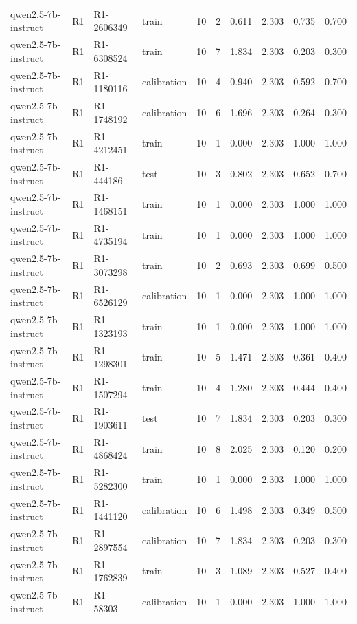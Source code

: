\begin{table}
\begin{tabular}{llllrrrrrr}
qwen2.5-7b-instruct & R1 & R1-2606349 & train & 10 & 2 & 0.611 & 2.303 & 0.735 & 0.700 \\
qwen2.5-7b-instruct & R1 & R1-6308524 & train & 10 & 7 & 1.834 & 2.303 & 0.203 & 0.300 \\
qwen2.5-7b-instruct & R1 & R1-1180116 & calibration & 10 & 4 & 0.940 & 2.303 & 0.592 & 0.700 \\
qwen2.5-7b-instruct & R1 & R1-1748192 & calibration & 10 & 6 & 1.696 & 2.303 & 0.264 & 0.300 \\
qwen2.5-7b-instruct & R1 & R1-4212451 & train & 10 & 1 & 0.000 & 2.303 & 1.000 & 1.000 \\
qwen2.5-7b-instruct & R1 & R1-444186 & test & 10 & 3 & 0.802 & 2.303 & 0.652 & 0.700 \\
qwen2.5-7b-instruct & R1 & R1-1468151 & train & 10 & 1 & 0.000 & 2.303 & 1.000 & 1.000 \\
qwen2.5-7b-instruct & R1 & R1-4735194 & train & 10 & 1 & 0.000 & 2.303 & 1.000 & 1.000 \\
qwen2.5-7b-instruct & R1 & R1-3073298 & train & 10 & 2 & 0.693 & 2.303 & 0.699 & 0.500 \\
qwen2.5-7b-instruct & R1 & R1-6526129 & calibration & 10 & 1 & 0.000 & 2.303 & 1.000 & 1.000 \\
qwen2.5-7b-instruct & R1 & R1-1323193 & train & 10 & 1 & 0.000 & 2.303 & 1.000 & 1.000 \\
qwen2.5-7b-instruct & R1 & R1-1298301 & train & 10 & 5 & 1.471 & 2.303 & 0.361 & 0.400 \\
qwen2.5-7b-instruct & R1 & R1-1507294 & train & 10 & 4 & 1.280 & 2.303 & 0.444 & 0.400 \\
qwen2.5-7b-instruct & R1 & R1-1903611 & test & 10 & 7 & 1.834 & 2.303 & 0.203 & 0.300 \\
qwen2.5-7b-instruct & R1 & R1-4868424 & train & 10 & 8 & 2.025 & 2.303 & 0.120 & 0.200 \\
qwen2.5-7b-instruct & R1 & R1-5282300 & train & 10 & 1 & 0.000 & 2.303 & 1.000 & 1.000 \\
qwen2.5-7b-instruct & R1 & R1-1441120 & calibration & 10 & 6 & 1.498 & 2.303 & 0.349 & 0.500 \\
qwen2.5-7b-instruct & R1 & R1-2897554 & calibration & 10 & 7 & 1.834 & 2.303 & 0.203 & 0.300 \\
qwen2.5-7b-instruct & R1 & R1-1762839 & train & 10 & 3 & 1.089 & 2.303 & 0.527 & 0.400 \\
qwen2.5-7b-instruct & R1 & R1-58303 & calibration & 10 & 1 & 0.000 & 2.303 & 1.000 & 1.000 \\

\end{tabular}
\end{table}
